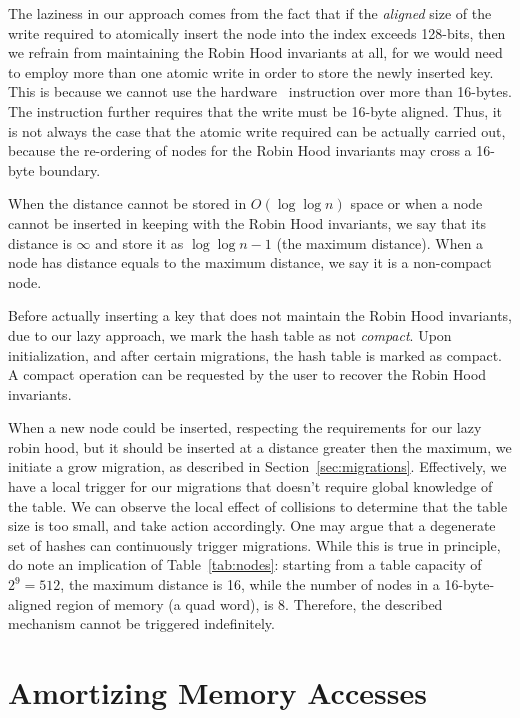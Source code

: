 The laziness in our approach comes from the fact that if the \emph{aligned} size of the write required to atomically insert the node into the index exceeds 128-bits, then we refrain from maintaining the Robin Hood invariants at all, for we would need to employ more than one atomic write in order to store the newly inserted key.
This is because we cannot use the hardware~\cite[CMPXCHG--Compare and Exchange]{x86-64} instruction over more than 16-bytes.
The instruction further requires that the write must be 16-byte aligned.
Thus, it is not always the case that the atomic write required can be actually carried out, because the re-ordering of nodes for the Robin Hood invariants may cross a 16-byte boundary.

When the distance cannot be stored in $O(\log \log n)$ space or when a node cannot be inserted in keeping with the Robin Hood invariants, we say that its distance is $\infty$ and store it as $\log \log n - 1$ (the maximum distance).
When a node has distance equals to the maximum distance, we say it is a non-compact node.

Before actually inserting a key that does not maintain the Robin Hood invariants, due to our lazy approach, we mark the hash table as not \emph{compact}.
Upon initialization, and after certain migrations, the hash table is marked as compact.
A compact operation can be requested by the user to recover the Robin Hood invariants.

When a new node could be inserted, respecting the requirements for our lazy robin hood, but it should be inserted at a distance greater then the maximum, we initiate a grow migration, as described in Section~\ref{sec:migrations}.
Effectively, we have a local trigger for our migrations that doesn't require global knowledge of the table.
We can observe the local effect of collisions to determine that the table size is too small, and take action accordingly.
One may argue that a degenerate set of hashes can continuously trigger migrations.
While this is true in principle, do note an implication of Table~\ref{tab:nodes}: starting from a table capacity of $2^9 = 512$, the maximum distance is 16, while the number of nodes in a 16-byte-aligned region of memory (a quad word), is 8.
Therefore, the described mechanism cannot be triggered indefinitely.


\section{Amortizing Memory Accesses}\label{sec:amortizing-memory-accesses}

